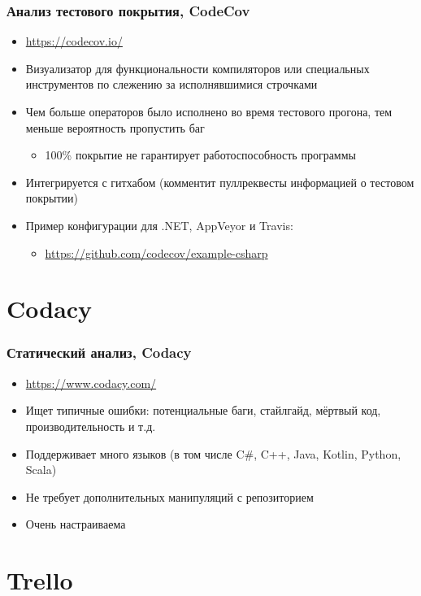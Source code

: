 \documentclass[xetex,mathserif,serif]{beamer}
\begin{document}
	\begin{frame}
		\frametitle{Анализ тестового покрытия, CodeCov}
		\begin{itemize}
			\item \url{https://codecov.io/}
			\item Визуализатор для функциональности компиляторов или специальных инструментов по слежению за исполнявшимися строчками
			\item Чем больше операторов было исполнено во время тестового прогона, тем меньше вероятность пропустить баг
			\begin{itemize}
				\item 100\% покрытие не гарантирует работоспособность программы
			\end{itemize}
			\item Интегрируется с гитхабом (комментит пуллреквесты информацией о тестовом покрытии)
			\item Пример конфигурации для .NET, AppVeyor и Travis:
			\begin{itemize}
				\item \url{https://github.com/codecov/example-csharp}
			\end{itemize}
		\end{itemize}
	\end{frame}

	\section{Codacy}

	\begin{frame}
		\frametitle{Статический анализ, Codacy}
		\begin{itemize}
			\item \url{https://www.codacy.com/}
			\item Ищет типичные ошибки: потенциальные баги, стайлгайд, мёртвый код, производительность и т.д.
			\item Поддерживает много языков (в том числе C\#, C++, Java, Kotlin, Python, Scala)
			\item Не требует дополнительных манипуляций с репозиторием
			\item Очень настраиваема
		\end{itemize}
	\end{frame}

	\section{Trello}
\end{document}
